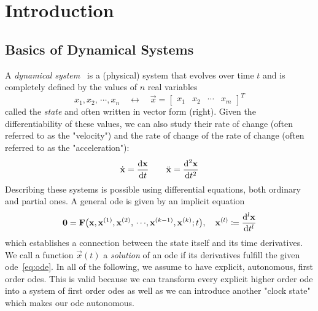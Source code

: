 \chapter{Introduction}
\label{c:introduction}





\section{Basics of Dynamical Systems}

	A \emph{dynamical system}~\cite{birkhoffDynamicalSystems1927} is a (physical) system that evolves over time \(t\) and is completely defined by the values of \(n\) real variables
	\begin{equation*}
		x_1, x_2, \,\cdots\!, x_n \quad\longleftrightarrow\quad \vec{x} = \begin{bmatrix} x_1 & x_2 & \cdots & x_m \end{bmatrix}^T
	\end{equation*}
	called the \emph{state} and often written in vector form (right). Given the differentiability of these values, we can also study their rate of change (often referred to as the "velocity") and the rate of change of the rate of change (often referred to as the "acceleration"):
	\begin{equation*}
		\dot{\boldsymbol{\mathrm{x}}} = \dv{\boldsymbol{\mathrm{x}}}{t} \qquad \ddot{\boldsymbol{\mathrm{x}}} = \dv[2]{\boldsymbol{\mathrm{x}}}{t}
	\end{equation*}
	Describing these systems is possible using differential equations, both ordinary and partial ones. A general \ac{ode} is given by an implicit equation
	\begin{equation}
		\boldsymbol{\mathrm{0}} = \boldsymbol{\mathrm{F}}\big( \boldsymbol{\mathrm{x}}, \boldsymbol{\mathrm{x}}^{(1)}, \boldsymbol{\mathrm{x}}^{(2)}, \,\cdots\!, \boldsymbol{\mathrm{x}}^{(k - 1)}, \boldsymbol{\mathrm{x}}^{(k)}; t \big),\quad \boldsymbol{\mathrm{x}}^{(l)} \coloneqq \dv[l]{\boldsymbol{\mathrm{x}}}{t}  \label{eq:ode}
	\end{equation}
	which establishes a connection between the state itself and its time derivatives. We call a function \( \vec{x}(t) \) a \emph{solution} of an \ac{ode} if its derivatives fulfill the given \ac{ode}~\eqref{eq:ode}. In all of the following, we assume to have explicit, autonomous, first order \acp{ode}. This is valid because we can transform every explicit higher order \ac{ode} into a system of first order \acp{ode} as well as we can introduce another "clock state" which makes our \ac{ode} autonomous.

